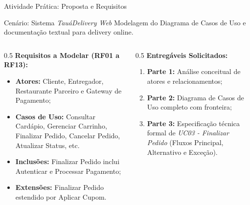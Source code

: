 \documentclass[10pt]{beamer}
\begin{document}
\begin{frame}{Atividade Prática: Proposta e Requisitos}
    \begin{block}{Cenário: Sistema \textit{TauáDelivery Web}}
        Modelagem do Diagrama de Casos de Uso e documentação textual para delivery online.
    \end{block}
    \vspace{0.15cm}
    \begin{columns}
        \begin{column}{0.5\textwidth}
            \textbf{Requisitos a Modelar (RF01 a RF13):}
            \begin{itemize}
                \item \textbf{Atores:} Cliente, Entregador, Restaurante Parceiro e Gateway de Pagamento;
                \item \textbf{Casos de Uso:} Consultar Cardápio, Gerenciar Carrinho, Finalizar Pedido, Cancelar Pedido, Atualizar Status, etc.
                \item \textbf{Inclusões:} Finalizar Pedido inclui Autenticar e Processar Pagamento;
                \item \textbf{Extensões:} Finalizar Pedido estendido por Aplicar Cupom.
            \end{itemize}
        \end{column}
        \begin{column}{0.5\textwidth}
            \textbf{Entregáveis Solicitados:}
            \begin{enumerate}
                \item \textbf{Parte 1:} Análise conceitual de atores e relacionamentos;
                \item \textbf{Parte 2:} Diagrama de Casos de Uso completo com fronteira;
                \item \textbf{Parte 3:} Especificação técnica formal de \textit{UC03 - Finalizar Pedido} (Fluxos Principal, Alternativo e Exceção).
            \end{enumerate}
        \end{column}
    \end{columns}
\end{frame}
\end{document}
